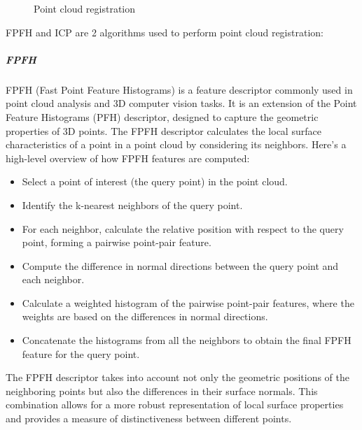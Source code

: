\documentclass{article}
\begin{document}
	\begin{figure}[H]
		\centering
		\caption{Point cloud registration}
		\label{fig:pointcloud-align}
	\end{figure}
	
	FPFH and ICP are 2 algorithms used to perform point cloud registration:
	
	\subparagraph{FPFH}
	
	FPFH (Fast Point Feature Histograms) is a feature descriptor commonly used in point cloud analysis and 3D computer vision tasks. It is an extension of the Point Feature Histograms (PFH) descriptor, designed to capture the geometric properties of 3D points. The FPFH descriptor calculates the local surface characteristics of a point in a point cloud by considering its neighbors. Here's a high-level overview of how FPFH features are computed:
	\begin{itemize}
		\item Select a point of interest (the query point) in the point cloud.
		\item Identify the k-nearest neighbors of the query point.
		\item For each neighbor, calculate the relative position with respect to the query point, forming a pairwise point-pair feature.
		\item Compute the difference in normal directions between the query point and each neighbor.
		\item Calculate a weighted histogram of the pairwise point-pair features, where the weights are based on the differences in normal directions.
		\item Concatenate the histograms from all the neighbors to obtain the final FPFH feature for the query point.
	\end{itemize}
	
	The FPFH descriptor takes into account not only the geometric positions of the neighboring points but also the differences in their surface normals. This combination allows for a more robust representation of local surface properties and provides a measure of distinctiveness between different points.
	
\end{document}
